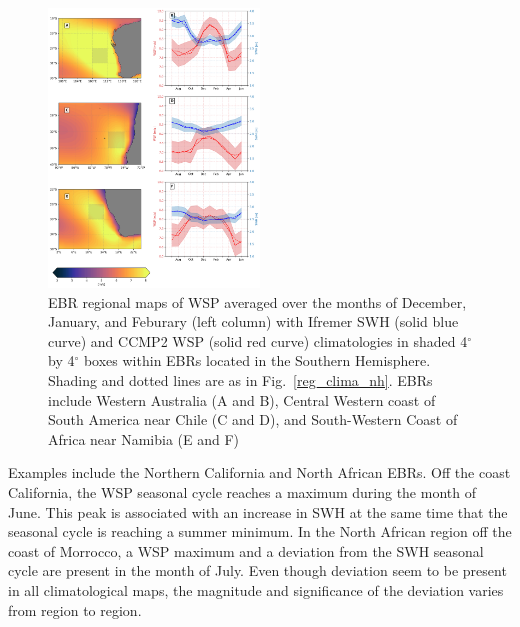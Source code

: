 \documentclass[draft,linenumbers]{agujournal2018}
\begin{document}
\begin{figure}[tbh]
\centering
\includegraphics[width=0.5\textwidth]{figs/regional_climatologies/paper_regional_clima_sh.png}
\caption{EBR regional maps of WSP averaged over the months of December, January, and Feburary (left column) with Ifremer SWH (solid blue curve) and CCMP2 WSP (solid red curve) climatologies in shaded 4$^{\circ}$ by 4$^{\circ}$ boxes within EBRs located in the Southern Hemisphere. Shading and dotted lines are as in Fig.~\ref{reg_clima_nh}. EBRs include Western Australia (A and B), Central Western coast of South America near Chile (C and D), and South-Western Coast of Africa near Namibia (E and F)}
\label{reg_clima_sh}
\end{figure}



Examples include the Northern California and North African EBRs. Off the coast California, the WSP seasonal cycle reaches a maximum during the month of June. This peak is associated with an increase in SWH at the same time that the seasonal cycle is reaching a summer minimum. In the North African region off the coast of Morrocco, a WSP maximum and a deviation from the SWH seasonal cycle are present in the month of July. Even though deviation seem to be present in all climatological maps, the magnitude and significance of the deviation varies from region to region. 
\end{document}
